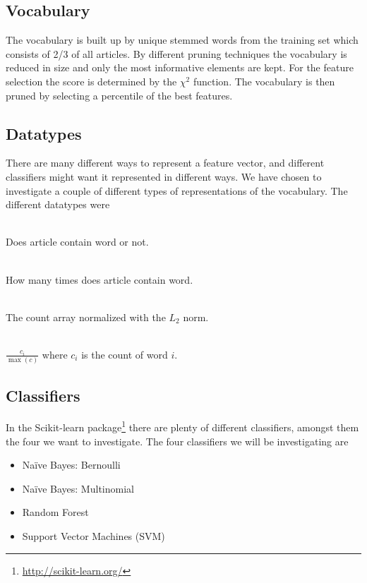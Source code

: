 \subsection{Vocabulary}
The vocabulary is built up by unique stemmed words from the training set which consists of 2/3 of all articles. By different pruning techniques the vocabulary is reduced in size and only the most informative elements are kept. For the feature selection the score is determined by the $\chi^2$ function. The vocabulary is then pruned by selecting a percentile of the best features.
\subsection{Datatypes}
There are many different ways to represent a feature vector, and different classifiers might want it represented in different ways. We have chosen to investigate a couple of different types of representations of the vocabulary. The different datatypes were
\begin{description}
\item[Binary:]\ \\Does article contain word or not.
\item[Count:]\ \\How many times does article contain word.
\item[$L_2$-normalized:]\ \\ The count array normalized with the $L_2$ norm. 
\item[Mapped value from 0 to 1:]\ \\ $\frac{c_i}{\max(c)}$ where $c_i$ is the count of word $i$.
\end{description}

\subsection{Classifiers}
In the Scikit-learn package\footnote{\url{http://scikit-learn.org/}} there are plenty of different classifiers, amongst them the four we want to investigate. The four classifiers we will be investigating are
\begin{itemize}[noitemsep,nolistsep]
\item Naïve Bayes: Bernoulli
\item Naïve Bayes: Multinomial
\item Random Forest 
\item Support Vector Machines (SVM)
\end{itemize}

